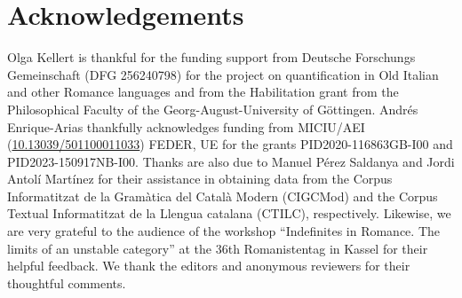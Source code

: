 \documentclass[output=paper,colorlinks,citecolor=brown]{langscibook}
\begin{document}
\section*{Acknowledgements}\label{sec:kea8}
\begin{sloppypar}
Olga Kellert is thankful for the funding support from Deutsche Forschungs Gemeinschaft (DFG 256240798) for the project on quantification in Old Italian and other Romance languages and from the Habilitation grant from the Philosophical Faculty of the Georg-August-University of Göttingen. Andrés Enrique-Arias thankfully acknowledges funding from MICIU\slash AEI (\href{https://data.crossref.org/fundingdata/funder/10.13039/501100011033}{10.13039/501100011033}) FEDER, UE for the grants PID2020\hyp 116863GB\hyp I00 and PID2023-150917NB-I00. Thanks are also due to Manuel Pérez Saldanya and Jordi Antolí Martínez for their assistance in obtaining data from the Corpus Informatitzat de la Gramàtica del Català Modern (CIGCMod) and the Corpus Textual Informatitzat de la Llengua catalana (CTILC), respectively. Likewise, we are very grateful to the audience of the workshop “Indefinites in Romance. The limits of an unstable category” at the 36th Romanistentag in Kassel for their helpful feedback. We thank the editors and anonymous reviewers for their thoughtful comments.
\end{sloppypar}
{\sloppy\printbibliography[heading=subbibliography,notkeyword=this]}
\end{document}
